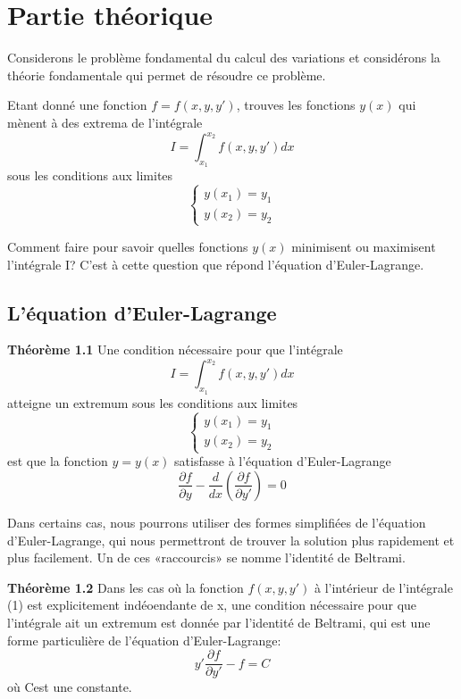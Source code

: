 \documentclass[11pt,a4paper]{report}%
\begin{document}
	\section{Partie théorique}
	 Considerons le problème fondamental du calcul des variations et considérons la théorie fondamentale qui permet de résoudre  ce problème.
	 
	 Etant donné une fonction $f=f(x,y,y')$, trouves les fonctions $y(x)$ qui mènent à des extrema de l'intégrale \[I=\int_{x_1}^{x_2} f(x,y,y')dx\] sous les conditions aux limites 
	 \begin{equation*}
	 \begin{cases}
	 y(x_1)=y_1
	 \\
	 y(x_2)=y_2
	 \end{cases}
	 \end{equation*}
	 
	 Comment faire pour savoir quelles fonctions $y(x)$ minimisent ou maximisent l'intégrale I? C'est à cette question que répond l'équation d'Euler-Lagrange.
	 
	 \subsection{L'équation d'Euler-Lagrange}
	  \textbf{Théorème 1.1} Une condition nécessaire pour que l'intégrale
	   \[I=\int_{x_1}^{x_2} f(x,y,y')dx\] atteigne un extremum sous les conditions aux limites 
	   \begin{equation*}
	   \begin{cases}
	   y(x_1)=y_1
	   \\
	   y(x_2)=y_2
	   \end{cases}
	   \end{equation*}
	    est que la fonction $y=y(x)$ satisfasse à l'équation d'Euler-Lagrange
	    \[\frac{\partial f}{\partial y}- \frac{d}{dx}(\frac{\partial f}{\partial y'})=0\]


		Dans certains cas, nous pourrons utiliser des formes simplifiées de l'équation d'Euler-Lagrange, qui nous permettront de trouver la solution plus rapidement et plus facilement. Un de ces «raccourcis» se nomme l'identité de Beltrami.	 
		
		\textbf{Théorème 1.2} Dans les cas où la fonction $f(x,y,y')$ à l'intérieur de l'intégrale (1) est explicitement indéoendante de x, une condition nécessaire pour que l'intégrale ait un extremum est donnée par l'identité de Beltrami, qui est une forme particulière de l'équation d'Euler-Lagrange: 
		\[y'\frac{\partial f}{\partial y'}-f=C\]
		où Cest une constante.
		
\end{document}
